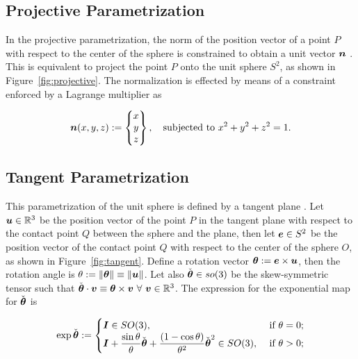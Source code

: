 \documentclass[12pt]{article}
\numberwithin{equation}{section}
\begin{document}
\subsection{Projective Parametrization}
\label{subsec:projective}

In the projective parametrization, the norm of the position vector of
a point $P$ with respect to the center of the sphere is constrained to
obtain a unit vector ${\boldsymbol{n}}$ \citep{Ortiz.etal:1987}. This is
equivalent to project the point $P$ onto the unit sphere $S^2$, as
shown in Figure~\ref{fig:projective}. The normalization is effected
by means of a constraint enforced by a Lagrange multiplier as

\begin{equation}
  {\boldsymbol{n}}(x,y,z)
  := 
  \begin{Bmatrix}
    x
    \\
    y
    \\
    z
  \end{Bmatrix},
  \quad
  \text{subjected to}~x^2+y^2+z^2 = 1.
\end{equation}

\subsection{Tangent Parametrization}
\label{subsec:tangent}

This parametrization of the unit sphere is defined by a tangent plane
\citep{Simo.Fox:1989}. Let ${\boldsymbol{u}}\in \mathbb{R}^3$ be the position vector
of the point $P$ in the tangent plane with respect to the contact
point $Q$ between the sphere and the plane, then let ${\boldsymbol{e}} \in S^2$ be
the position vector of the contact point $Q$ with respect to the
center of the sphere $O$, as shown in Figure~\ref{fig:tangent}. Define
a rotation vector ${\boldsymbol{\theta}} := {\boldsymbol{e}} \times {\boldsymbol{u}}$, then the rotation angle
is $\theta := \| {\boldsymbol{\theta}} \| \equiv \| {\boldsymbol{u}} \|$. Let also
$\check{{\boldsymbol{\theta}}} \in so(3)$ be the skew-symmetric tensor such that
$\check{{\boldsymbol{\theta}}} \cdot {\boldsymbol{v}} \equiv {\boldsymbol{\theta}} \times {\boldsymbol{v}} \ \forall \ {\boldsymbol{v}}
\in \mathbb{R}^3$. The expression for the exponential map for
$\check{{\boldsymbol{\theta}}}$ is

\begin{equation}
  \exp \check{{\boldsymbol{\theta}}}
  :=
  \begin{cases}
    {\boldsymbol{I}} \in SO(3),
    &
    \text{ if }\theta = 0;
    \\
    \displaystyle{
      {\boldsymbol{I}}+ \frac{\sin \theta}{\theta} \check{{\boldsymbol{\theta}}} +
      \frac{(1 - \cos \theta)}{\theta^2} \check{{\boldsymbol{\theta}}}^2 \in SO(3),
    }
    &
    \text{ if }\theta > 0;
  \end{cases}
  \label{eq:Rodrigues-formula}
\end{equation}
\end{document}
